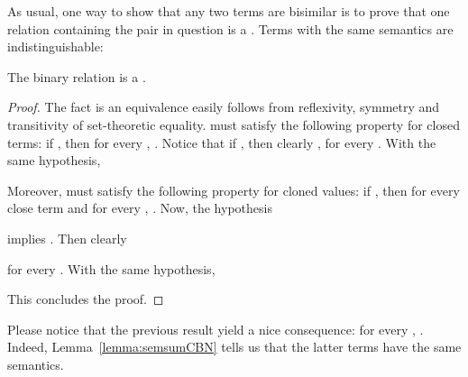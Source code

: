 As usual, one way to show that any two terms are bisimilar is to prove that one relation
containing the pair in question is a . 
Terms with the same semantics are indistinguishable:
\begin{lemma}\label{lemma:samesem}
  The binary relation  is a .
\end{lemma}
\begin{proof}
  The fact  is an equivalence easily follows from reflexivity,
  symmetry and transitivity of set-theoretic equality.  must
  satisfy the following property for closed terms: if
  , then for every
  ,
  . Notice
  that if , then clearly
  ,
  for every . With the same hypothesis,
  
  Moreover,  must satisfy the following property for cloned
  values: if
  , then for
  every close term  and for every
  ,
  . Now,
  the hypothesis
  
  implies . Then clearly
  
  for every . With the same hypothesis,
  
  This concludes the proof.
\end{proof}
Please notice that the previous result yield a nice consequence: for every
,
. Indeed,
Lemma~\ref{lemma:semsumCBN} tells us that the latter terms have the same
semantics.

